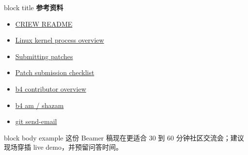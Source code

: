 \documentclass[aspectratio=169,professionalfonts]{beamer}
\newcommand{\sectiontitle}[1]{
  \begin{beamercolorbox}[wd=\linewidth,sep=0.7em,rounded=true]{block title}
    \usebeamerfont*{frametitle}\Large\bfseries #1
  \end{beamercolorbox}
  \vspace{0.4em}
}
\begin{document}
\begin{frame}
  \sectiontitle{参考资料}
  \footnotesize
  \begin{itemize}
    \item \href{https://github.com/ChenMiaoi/CRIEW}{CRIEW README}
    \item \href{https://docs.kernel.org/process/}{Linux kernel process overview}
    \item \href{https://docs.kernel.org/process/submitting-patches.html}{Submitting patches}
    \item \href{https://docs.kernel.org/process/submit-checklist.html}{Patch submission checklist}
    \item \href{https://b4.docs.kernel.org/en/latest/contributor/overview.html}{b4 contributor overview}
    \item \href{https://b4.docs.kernel.org/en/latest/maintainer/am-shazam.html}{b4 am / shazam}
    \item \href{https://git-scm.com/docs/git-send-email}{git send-email}
  \end{itemize}
  \vspace{0.7em}
  \begin{beamercolorbox}[wd=\linewidth,sep=0.8em,rounded=true]{block body example}
    这份 Beamer 稿现在更适合 30 到 60 分钟社区交流会；建议现场穿插 live demo，并预留问答时间。
  \end{beamercolorbox}
\end{frame}
\end{document}
